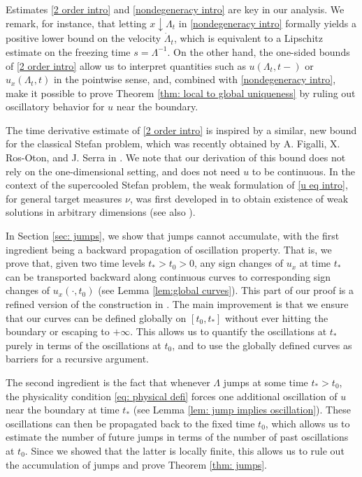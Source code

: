 \documentclass{article}
\numberwithin{equation}{section}
\numberwithin{figure}{section}
\theoremstyle{plain}
\theoremstyle{plain}
\theoremstyle{plain}
\theoremstyle{plain}
\theoremstyle{definition}
\theoremstyle{remark}
\begin{document}
Estimates \eqref{2 order intro} and \eqref{nondegeneracy intro} are key in our analysis. We remark, for instance, that letting $x \downarrow \Lambda_{t}$ in \eqref{nondegeneracy intro}
formally yields a positive lower bound on the velocity $\dot \Lambda_t$, which is equivalent to a Lipschitz estimate on the freezing time $s=\Lambda^{-1}$. On the other hand, the one-sided bounds of \eqref{2 order intro} allow us to interpret quantities such as $u(\Lambda_{t},t-)$ or $u_x(\Lambda_t,t)$ in the pointwise sense, and, combined with \eqref{nondegeneracy intro}, make it possible to prove Theorem \ref{thm: local to global uniqueness} by ruling out oscillatory behavior for $u$ near the boundary.

The time derivative estimate of \eqref{2 order intro} is inspired by a similar, new bound for the classical Stefan problem, which was recently obtained by A. Figalli, X. Ros-Oton, and J. Serra in \cite[Prop. 3.4]{figalli}. We note that our derivation of this bound does not rely on the one-dimensional setting, and does not need $u$ to be continuous.  In the context of the supercooled Stefan problem, the weak formulation of \eqref{u eq intro}, for general target measures $\nu$, was first developed in \cite{KK,CKK} to obtain existence of weak solutions in arbitrary dimensions (see also \cite{GhoKimPal}).

In Section \ref{sec: jumps}, we show that jumps cannot accumulate, with the first ingredient being a backward propagation of oscillation property. That is, we prove that, given two time levels $t_*>t_0>0$, any sign changes of $u_x$ at time $t_*$ can be transported backward along continuous curves to corresponding sign changes of $u_x(\cdot,t_0)$ (see Lemma \ref{lem:global curves}). This part of our proof is a refined version of the construction in \cite[Lem.\ 4.1]{delarue}. The main improvement is that we ensure that our curves can be defined globally on $[t_0,t_*]$ without ever hitting the boundary or escaping to $+\infty$. This allows us to quantify the oscillations at $t_*$ purely in terms of the oscillations at $t_0$, and to use the globally defined curves as barriers for a recursive argument. 

The second ingredient is the fact that whenever $\Lambda$ jumps at some time $t_*>t_0$, the physicality condition \eqref{eq: physical defi} forces one additional oscillation of $u$ near the boundary at time $t_*$ (see Lemma \ref{lem: jump implies oscillation}). These oscillations can then be propagated back to the fixed time $t_0$, which allows us to estimate the number of future jumps in terms of the number of past oscillations at $t_0$. Since we showed that the latter is locally finite, this allows us to rule out the accumulation of jumps and prove Theorem \ref{thm: jumps}.
\end{document}
